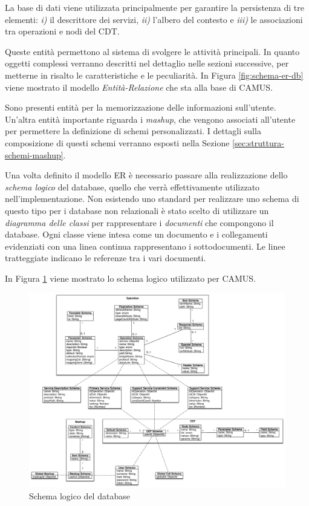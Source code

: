La base di dati viene utilizzata principalmente per garantire la persistenza di tre elementi: \emph{i)} il descrittore dei servizi, \emph{ii)} l'albero del contesto e \emph{iii)} le associazioni tra operazioni e nodi del CDT.

Queste entità permettono al sistema di svolgere le attività principali. In quanto oggetti complessi verranno descritti nel dettaglio nelle sezioni successive, per metterne in risalto le caratteristiche e le peculiarità. In Figura \ref{fig:schema-er-db} viene mostrato il modello \emph{Entità-Relazione} che sta alla base di CAMUS.

Sono presenti entità per la memorizzazione delle informazioni sull'u\-ten\-te. Un'al\-tra entità importante riguarda i \emph{mashup}, che vengono associati all'utente per permettere la definizione di schemi personalizzati. I dettagli sulla composizione di questi schemi verranno esposti nella Sezione \ref{sec:struttura-schemi-mashup}.

Una volta definito il modello ER è necessario passare alla realizzazione dello \emph{schema logico} del database, quello che verrà effettivamente utilizzato nell'im\-ple\-men\-ta\-zio\-ne. Non esistendo uno standard per realizzare uno schema di questo tipo per i database non relazionali è stato scelto di utilizzare un \emph{diagramma delle classi} per rappresentare i \emph{documenti} che compongono il database. Ogni classe viene intesa come un documento e i collegamenti evidenziati con una linea continua rappresentano i sottodocumenti. Le linee tratteggiate indicano le referenze tra i vari documenti.

In Figura \ref{fig:schema-logico-db} viene mostrato lo schema logico utilizzato per CAMUS.

\begin{figure}[!b]
	\centering
	\includegraphics[width=\textwidth]{5-implementazione-backend/Immagini/schema_logico_db.pdf}
	\caption{Schema logico del database}\label{fig:schema-logico-db}
\end{figure}

